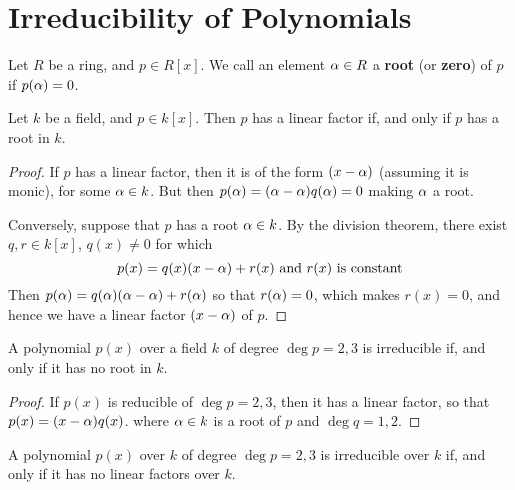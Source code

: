 \section{Irreducibility of Polynomials}
\label{section_7.3}

\begin{definition}
    Let $R$ be a ring, and  $p \in R[x]$. We call an element $\alpha \in R$ a
    \textbf{root} (or \textbf{zero}) of $p$ if  $p(\alpha)=0$.
\end{definition}

\begin{lemma}\label{lemma_7.3.1}
    Let $k$ be a field, and  $p \in k[x]$. Then $p$ has a linear factor if, and
    only if  $p$ has a root in  $k$.
\end{lemma}
\begin{proof}
    If $p$ has a linear factor, then it is of the form  $(x-\alpha)$ (assuming it is
    monic), for some $\alpha \in k$. But then  $p(\alpha)=(\alpha-\alpha)q(\alpha)=0$ making $\alpha$ a
    root.

    Conversely, suppose that $p$ has a root  $\alpha \in k$. By the division
    theorem, there exist $q, r \in k[x]$, $q(x) \neq 0$ for which
    \begin{equation*}
        p(x)=q(x)(x-\alpha)+r(x) \text{ and } r(x) \text{ is constant}
    \end{equation*}
    Then $p(\alpha)=q(\alpha)(\alpha-\alpha)+r(\alpha)$ so that $r(\alpha)=0$, which makes $r(x)=0$, and
    hence we have a linear factor $(x-\alpha)$ of $p$.
\end{proof}
\begin{corollary}
    A polynomial $p(x)$ over a field $k$ of degree $\deg{p}=2,3$ is irreducible if,
    and only if it has no root in $k$.
\end{corollary}
\begin{proof}
  If $p(x)$ is reducible of $\deg{p}=2,3$, then it has a linear
  factor, so that $p(x)=(x-\alpha)q(x)$. where $\alpha \in k$ is a root of $p$ and
  $\deg{q}=1,2$.
\end{proof}
\begin{corollary}
  A polynomial $p(x)$ over $k$ of degree $\deg{p}=2,3$ is irreducible
  over $k$ if, and only if it has no linear factors over $k$.
\end{corollary}


